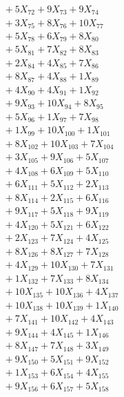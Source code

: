 \documentclass[a4paper,10pt]{article}
\begin{document}
{\begin{align}
&\;  + 5 X_{72} + 9 X_{73} + 9 X_{74} \\[0.3ex]
&\;  + 3 X_{75} + 8 X_{76} + 10 X_{77} \\[0.3ex]
&\;  + 5 X_{78} + 6 X_{79} + 8 X_{80} \\[0.3ex]
&\;  + 5 X_{81} + 7 X_{82} + 8 X_{83} \\[0.3ex]
&\;  + 2 X_{84} + 4 X_{85} + 7 X_{86} \\[0.3ex]
&\;  + 8 X_{87} + 4 X_{88} + 1 X_{89} \\[0.3ex]
&\;  + 4 X_{90} + 4 X_{91} + 1 X_{92} \\[0.3ex]
&\;  + 9 X_{93} + 10 X_{94} + 8 X_{95} \\[0.3ex]
&\;  + 5 X_{96} + 1 X_{97} + 7 X_{98} \\[0.3ex]
&\;  + 1 X_{99} + 10 X_{100} + 1 X_{101} \\[0.5ex]\allowbreak
&\;  + 8 X_{102} + 10 X_{103} + 7 X_{104} \\[0.3ex]
&\;  + 3 X_{105} + 9 X_{106} + 5 X_{107} \\[0.3ex]
&\;  + 4 X_{108} + 6 X_{109} + 5 X_{110} \\[0.3ex]
&\;  + 6 X_{111} + 5 X_{112} + 2 X_{113} \\[0.3ex]
&\;  + 8 X_{114} + 2 X_{115} + 6 X_{116} \\[0.3ex]
&\;  + 9 X_{117} + 5 X_{118} + 9 X_{119} \\[0.3ex]
&\;  + 4 X_{120} + 5 X_{121} + 6 X_{122} \\[0.3ex]
&\;  + 2 X_{123} + 7 X_{124} + 4 X_{125} \\[0.3ex]
&\;  + 8 X_{126} + 8 X_{127} + 7 X_{128} \\[0.3ex]
&\;  + 4 X_{129} + 10 X_{130} + 7 X_{131} \\[0.5ex]\allowbreak
&\;  + 1 X_{132} + 7 X_{133} + 8 X_{134} \\[0.3ex]
&\;  + 10 X_{135} + 10 X_{136} + 4 X_{137} \\[0.3ex]
&\;  + 10 X_{138} + 10 X_{139} + 1 X_{140} \\[0.3ex]
&\;  + 7 X_{141} + 10 X_{142} + 4 X_{143} \\[0.3ex]
&\;  + 9 X_{144} + 4 X_{145} + 1 X_{146} \\[0.3ex]
&\;  + 8 X_{147} + 7 X_{148} + 3 X_{149} \\[0.3ex]
&\;  + 9 X_{150} + 5 X_{151} + 9 X_{152} \\[0.3ex]
&\;  + 1 X_{153} + 6 X_{154} + 4 X_{155} \\[0.3ex]
&\;  + 9 X_{156} + 6 X_{157} + 5 X_{158} \\[0.3ex]

\end{align}}
\end{document}
